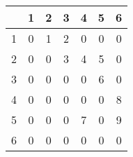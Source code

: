 \begin{tabular}{c|cccccc}
	  & 1 & 2 & 3 & 4 & 5 & 6 \\
	\hline
	1 & 0 & 1 & 2 & 0 & 0 & 0 \\
	2 & 0 & 0 & 3 & 4 & 5 & 0 \\
	3 & 0 & 0 & 0 & 0 & 6 & 0 \\
	4 & 0 & 0 & 0 & 0 & 0 & 8 \\
	5 & 0 & 0 & 0 & 7 & 0 & 9 \\
	6 & 0 & 0 & 0 & 0 & 0 & 0 \\
\end{tabular}

